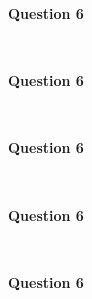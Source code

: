 \documentclass[addpoints]{exam}
\begin{document}
\begin{questions}
\begin{solution}
\end{solution}

\question \textbf{ Question 6}

\begin{solution}\\
 
\end{solution}

\question \textbf{ Question 6}

\begin{solution}\\
 
\end{solution}

\question \textbf{ Question 6}

\begin{solution}\\
 
\end{solution}

\question \textbf{ Question 6}

\begin{solution}\\
 
\end{solution}

\question \textbf{ Question 6}

\begin{solution}\\
 
\end{solution}






\end{questions}
\end{document}
